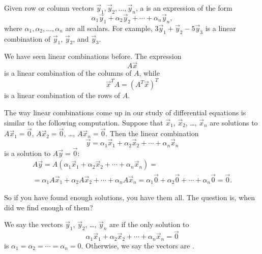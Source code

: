 Given row or column vectors $\vec{y}_1, \vec{y}_2, \ldots, \vec{y}_n$,
a \emph{} is an expression of the form
\begin{equation*}
\alpha_1 \vec{y}_1 + 
\alpha_2 \vec{y}_2 + 
\cdots +
\alpha_n \vec{y}_n ,
\end{equation*}
where $\alpha_1, \alpha_2, \ldots, \alpha_n$ are all scalars.
For example,
$3 \vec{y}_1 + \vec{y}_2 - 5 \vec{y}_3$ is a linear combination
of $\vec{y}_1$, $\vec{y}_2$, and $\vec{y}_3$.

We have seen linear combinations before.  The expression
\begin{equation*}
A \vec{x}
\end{equation*}
is a linear combination of the columns of $A$, while
\begin{equation*}
\vec{x}^T A = (A^T \vec{x})^T
\end{equation*}
is a linear combination of the rows of $A$.

The way linear combinations come up in our study of differential
equations is similar to the following computation.  Suppose that
$\vec{x}_1$, $\vec{x}_2$, \ldots, $\vec{x}_n$ are solutions
to $A \vec{x}_1 = \vec{0}$, 
$A \vec{x}_2 = \vec{0}$, \ldots,
$A \vec{x}_n = \vec{0}$.
Then the linear combination
\begin{equation*}
\vec{y} = \alpha_1 \vec{x}_1 + 
\alpha_2 \vec{x}_2 + 
\cdots +
\alpha_n \vec{x}_n 
\end{equation*}
is a solution to $A \vec{y} = \vec{0}$:
\begin{multline*}
A \vec{y} =
A (\alpha_1 \vec{x}_1 + 
\alpha_2 \vec{x}_2 + 
\cdots +
\alpha_n \vec{x}_n )
=
\\
=
\alpha_1 A \vec{x}_1 + 
\alpha_2 A \vec{x}_2 + 
\cdots +
\alpha_n A \vec{x}_n
=
\alpha_1 \vec{0} + 
\alpha_2 \vec{0} + 
\cdots +
\alpha_n \vec{0} = \vec{0} .
\end{multline*}

So if you have found enough solutions, you have them all.  The question is,
when did we find enough of them?

We say the vectors $\vec{y}_1$, $\vec{y}_2$, \ldots, $\vec{y}_n$ are
\emph{} if the only solution to
\begin{equation*}
\alpha_1 \vec{x}_1 + 
\alpha_2 \vec{x}_2 + 
\cdots +
\alpha_n \vec{x}_n 
=
\vec{0}
\end{equation*}
is $\alpha_1 = \alpha_2 = \cdots = \alpha_n = 0$.
Otherwise, we say the vectors are \emph{}.

